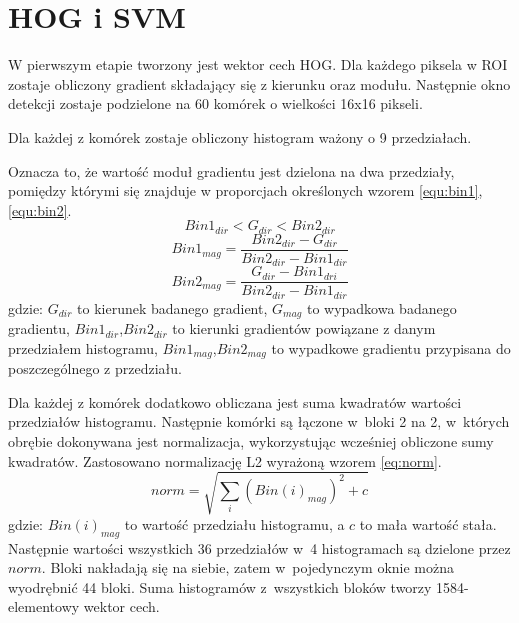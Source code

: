 \section{HOG i SVM}
W pierwszym etapie tworzony jest wektor cech HOG. Dla każdego piksela w ROI zostaje obliczony gradient składający się z kierunku oraz modułu.
Następnie okno detekcji zostaje podzielone na 60 komórek o wielkości 16x16 pikseli. 




Dla każdej z komórek zostaje obliczony histogram ważony o 9 przedziałach. 

Oznacza to, że wartość moduł gradientu jest dzielona na dwa przedziały, pomiędzy którymi się znajduje w proporcjach określonych wzorem \eqref{equ:bin1}, \eqref{equ:bin2}.
\begin{equation}\label{equ:bin0}
Bin1_{dir} < G_{dir} < Bin2_{dir}
\end{equation}
\begin{equation}\label{equ:bin1}
Bin1_{mag} = \frac{Bin2_{dir} - G_{dir}}{Bin2_{dir} - Bin1_{dir}}
\end{equation}
\begin{equation}\label{equ:bin2}
Bin2_{mag} = \frac{G_{dir}- Bin1_{dri}}{Bin2_{dir} - Bin1_{dir}}
\end{equation}
\noindent gdzie: $G_{dir}$ to kierunek badanego gradient, $G_{mag}$ to wypadkowa badanego gradientu, $Bin1_{dir}$,$Bin2_{dir}$ to kierunki gradientów powiązane z danym przedziałem histogramu, $Bin1_{mag}$,$Bin2_{mag}$ to wypadkowe gradientu przypisana do poszczególnego z przedziału.

Dla każdej z komórek dodatkowo obliczana jest suma kwadratów wartości przedziałów histogramu.
Następnie komórki są łączone w~bloki 2 na 2, w~których obrębie dokonywana jest normalizacja, wykorzystując wcześniej obliczone sumy kwadratów. 
Zastosowano normalizację L2 wyrażoną wzorem \eqref{eq:norm}.
\begin{equation}\label{eq:norm}
norm = \sqrt{\sum_{i} (Bin(i)_{mag})^2 + c}
\end{equation}
\noindent gdzie: $Bin(i)_{mag}$ to wartość przedziału histogramu, a $c$ to mała wartość stała.
Następnie wartości wszystkich 36 przedziałów w~4 histogramach są dzielone przez $norm$.
Bloki nakładają się na siebie, zatem w~pojedynczym oknie można wyodrębnić 44 bloki. 
Suma histogramów z~wszystkich bloków tworzy 1584-elementowy wektor cech.


